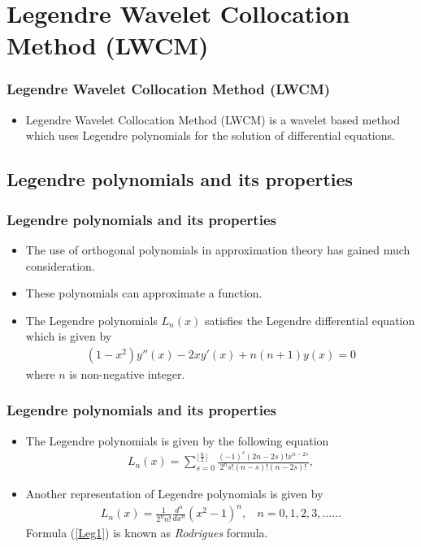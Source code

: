 \documentclass{beamer}
\begin{document}
	\section{Legendre Wavelet Collocation Method (LWCM)}
	\begin{frame}\frametitle{Legendre Wavelet Collocation Method (LWCM)}
\begin{itemize}	
	\justifying		
\item Legendre Wavelet Collocation Method (LWCM) is a wavelet based method which uses Legendre polynomials for the solution of differential equations.	
\end{itemize}
\end{frame}
\subsection*{Legendre polynomials and its properties}
\begin{frame}\frametitle{Legendre polynomials and its properties}
\begin{itemize}
	\justifying
\item The use of orthogonal polynomials in approximation theory has gained much consideration. 
\item These polynomials can approximate a function.	
\item The Legendre polynomials $L_{n}(x)$ satisfies the Legendre differential equation which is given by
\begin{eqnarray}
(1-x^2)y''(x)-2xy'(x)+n(n+1)y(x)=0
\end{eqnarray}
where $n$ is non-negative integer.
\end{itemize}
\end{frame}
\begin{frame}\frametitle{Legendre polynomials and its properties}
	\begin{itemize}
		\justifying
		\item	The Legendre polynomials is given by the following equation \cite{Alexendre}	
	\begin{eqnarray}
		L_n(x)=\sum _{s=0}^{\lfloor\frac{n}{2}\rfloor}\frac{(-1)^s (2 n-2 s)! x^{n-2 s}}{2^n s! (n-s)! (n-2 s)!},
		\end{eqnarray}	
	\item Another representation of Legendre polynomials is given by \cite{Alexendre}
	\begin{eqnarray}\label{Leg1}
	L_n(x)=\frac{1}{2^n n!}{\frac{d^n}{dx^n}}(x^2-1)^n,~~~~n=0,1,2,3,\text{...}\text{..}.
	\end{eqnarray}
	Formula (\ref{Leg1}) is known as \emph{Rodrigues} formula. 
	\end{itemize}
\end{frame}
\end{document}

